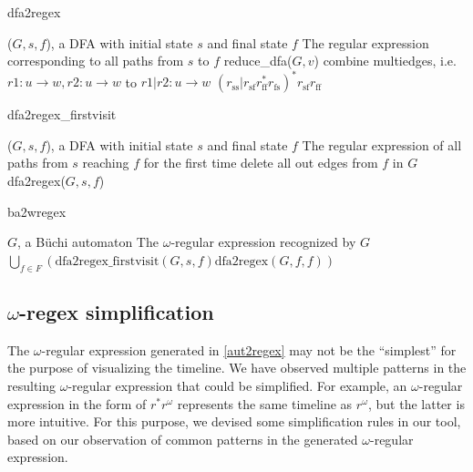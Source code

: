 \documentclass[preprint,12pt]{elsarticle}
\theoremstyle{definition}
\theoremstyle{remark}
\newcommand{\Buchi}{B\"{u}chi }
\begin{document}
\begin{algorithm}[h!]
    \caption{dfa2regex}
    \begin{algorithmic}
        \Require ($G, s, f$), a DFA with initial state $s$ and final state $f$
        \Ensure The regular expression corresponding to all paths from $s$ to $f$
            \State reduce\_dfa($G, v$)
            \State combine multiedges, i.e. $r1 : u \to w, r2 : u \to w$  to $r1 | r2 : u \to w$
        \EndWhile
        \State \Return $(r_\mathrm{ss}| r_\mathrm{sf} r_\mathrm{ff}^* r_\mathrm{fs})^* r_\mathrm{sf} r_\mathrm{ff}$
    \end{algorithmic}
\end{algorithm}

\begin{algorithm}[h!]
    \caption{dfa2regex\_firstvisit}
    \begin{algorithmic}
        \Require ($G, s, f$), a DFA with initial state $s$ and final state $f$
        \Ensure The regular expression of all paths from $s$ reaching $f$ for the first time
        \State delete all out edges from $f$ in $G$
        \State \Return dfa2regex($G, s, f$)
    \end{algorithmic}
\end{algorithm}

\begin{algorithm}[h!]
    \label{alg:ba2wregex}
    \caption{ba2wregex}
    \begin{algorithmic}
        \Require $G$, a \Buchi automaton
        \Ensure The $\omega$-regular expression recognized by $G$
        \State \Return $\bigcup_{f \in F}\left(\text{dfa2regex\_firstvisit}(G, s, f)\text{\^{}dfa2regex}(G, f, f) \right) $
    \end{algorithmic}
\end{algorithm}

\subsection{$\omega$-regex simplification} \label{regex-simplify}

The $\omega$-regular expression generated in \cref{aut2regex} may not be the ``simplest'' for the purpose of visualizing the timeline. We have observed multiple patterns in the resulting $\omega$-regular expression that could be simplified. For example, an $\omega$-regular expression in the form of $r^*r^{\omega}$ represents the same timeline as $r^{\omega}$, but the latter is more intuitive. For this purpose, we devised some simplification rules in our tool, based on our observation of common patterns in the generated $\omega$-regular expression.
\end{document}
